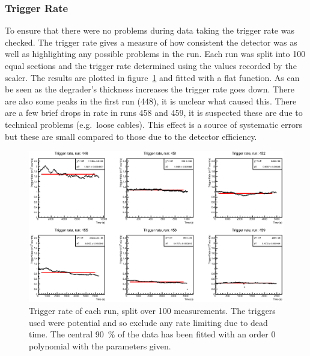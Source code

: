 \subsubsection{Trigger Rate} %
\label{sub:gain_stability}
To ensure that there were no problems during data taking the trigger rate was checked. The trigger rate gives a measure of how consistent the detector was as well as highlighting any possible problems in the run. Each run was split into 100 equal sections and the trigger rate determined using the values recorded by the scaler. The results are plotted in figure~\ref{fig:gain_stability} and fitted with a flat function. As can be seen as the degrader's thickness increases the trigger rate goes down. There are also some peaks in the first run (448), it is unclear what caused this. There are a few brief drops in rate in runs 458 and 459, it is suspected these are due to technical problems (e.g.\ loose cables). This effect is a source of systematic errors but these are small compared to those due to the detector efficiency.
%
\begin{figure}
      \centering
          \includegraphics[width=\textwidth]{images/momentum_spectrum/gain_stability.eps}
      \caption{Trigger rate of each run, split over 100 measurements. The triggers used were potential and so exclude any rate limiting due to dead time. The central 90~\% of the data has been fitted with an order 0 polynomial with the parameters given.}
      \label{fig:gain_stability}
\end{figure}


